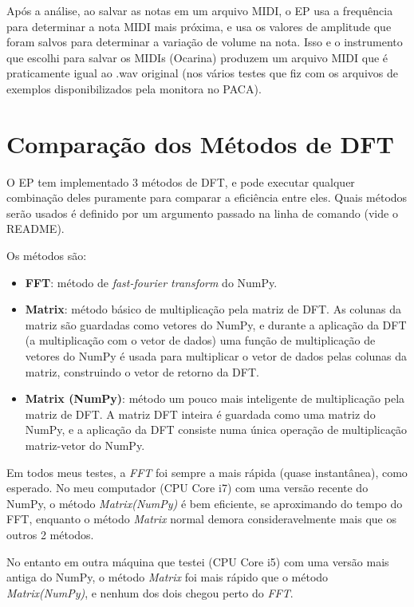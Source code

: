 \documentclass[a4paper,11pt]{article}
\begin{document}
Após a análise, ao salvar as notas em um arquivo MIDI, o EP usa a frequência para determinar a nota MIDI mais próxima, e usa
os valores de amplitude que foram salvos para determinar a variação de volume na nota. Isso e o instrumento que escolhi para
salvar os MIDIs (Ocarina) produzem um arquivo MIDI que é praticamente igual ao .wav original (nos vários testes que fiz com 
os arquivos de exemplos disponibilizados pela monitora no PACA).

\section{Comparação dos Métodos de DFT}

O EP tem implementado 3 métodos de DFT, e pode executar qualquer combinação deles puramente para comparar a eficiência entre
eles. Quais métodos serão usados é definido por um argumento passado na linha de comando (vide o README).

Os métodos são:
\begin{itemize}
  \item \textbf{FFT}: método de \textit{fast-fourier transform} do NumPy.
  \item \textbf{Matrix}: método básico de multiplicação pela matriz de DFT. As colunas da matriz são guardadas como vetores do
  NumPy, e durante a aplicação da DFT (a multiplicação com o vetor de dados) uma função de multiplicação de vetores do NumPy é 
  usada para multiplicar o vetor de dados pelas colunas da matriz, construindo o vetor de retorno da DFT.
  \item \textbf{Matrix (NumPy)}: método um pouco mais inteligente de multiplicação pela matriz de DFT. A matriz DFT inteira é
  guardada como uma matriz do NumPy, e a aplicação da DFT consiste numa única operação de multiplicação matriz-vetor do NumPy.
\end{itemize}

Em todos meus testes, a \textit{FFT} foi sempre a mais rápida (quase instantânea), como esperado. No meu computador (CPU Core i7)
com uma versão recente do NumPy, o método \textit{Matrix(NumPy)} é bem eficiente, se aproximando do tempo do FFT, enquanto o método
\textit{Matrix} normal demora consideravelmente mais que os outros 2 métodos.

No entanto em outra máquina que testei (CPU Core i5) com uma versão mais antiga do NumPy, o método \textit{Matrix} foi mais rápido
que o método \textit{Matrix(NumPy)}, e nenhum dos dois chegou perto do \textit{FFT}.
\end{document}
